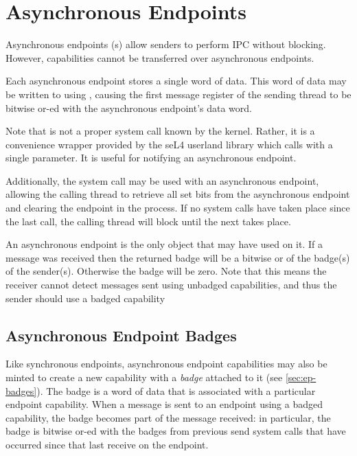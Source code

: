 \section{Asynchronous Endpoints}

Asynchronous endpoints (s)
allow senders to perform IPC without blocking.
However, capabilities cannot be transferred over asynchronous endpoints.

Each asynchronous endpoint stores a single word of data. This word of
data may be written to using , causing the
first message register of the sending thread to be bitwise or-ed with
the asynchronous endpoint's data word.

Note that  is not a proper system call
known by the kernel. Rather, it is a convenience
wrapper provided by the seL4 userland library which calls
 with a single parameter. It is
useful for notifying an asynchronous endpoint.

Additionally, the  system call may be used with an
asynchronous endpoint, allowing the calling thread to retrieve all set
bits from the asynchronous endpoint and clearing the endpoint in the
process. If no  system calls have taken place since the last
 call, the calling thread will block until the next
 takes place.

An asynchronous endpoint is the only object that may have
 used on it. If a message was received then the
returned badge will be a bitwise or of the badge(s) of the sender(s). Otherwise
the badge will be zero. Note that this means the receiver cannot detect
messages sent using unbadged capabilities, and thus the sender should use a
badged capability

\subsection{Asynchronous Endpoint Badges}

Like synchronous endpoints, asynchronous endpoint capabilities may also
be minted to create a new capability with a \emph{badge} attached to it (see \autoref{sec:ep-badges}).
The badge is a word of data that is associated with a particular
endpoint capability. When a message is sent to an endpoint using
a badged capability, the badge becomes part of the message received: in
particular, the badge is bitwise or-ed with the badges from
previous send system calls that have occurred since that last receive
on the endpoint.

